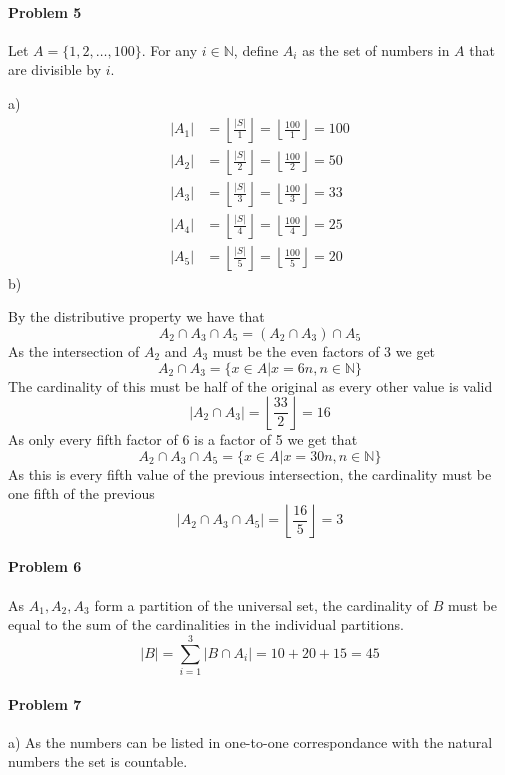 \paragraph{Problem 5}
Let $A=\{1,2,\ldots,100\}$. For any $i\in \mathbb{N}$, define $A_{i}$ as the set of numbers in $A$ that are divisible by $i$.

a)
\begin{align*}
    |A_{1}|&=\left\lfloor{\frac{|S|}{1}}\right\rfloor=\left\lfloor{\frac{100}{1}}\right\rfloor=100 \\
    |A_{2}|&=\left\lfloor{\frac{|S|}{2}}\right\rfloor=\left\lfloor{\frac{100}{2}}\right\rfloor=50 \\
    |A_{3}|&=\left\lfloor{\frac{|S|}{3}}\right\rfloor=\left\lfloor{\frac{100}{3}}\right\rfloor=33 \\
    |A_{4}|&=\left\lfloor{\frac{|S|}{4}}\right\rfloor=\left\lfloor{\frac{100}{4}}\right\rfloor=25 \\
    |A_{5}|&=\left\lfloor{\frac{|S|}{5}}\right\rfloor=\left\lfloor{\frac{100}{5}}\right\rfloor=20
\end{align*}
b)

By the distributive property we have that
\[
    A_2\cap A_3\cap A_5=(A_2\cap A_3)\cap A_5
\]
As the intersection of $A_2$ and $A_3$ must be the even factors of 3 we get
\[
    A_2\cap A_3=\{x\in A|x=6n,n\in \mathbb{N}\}
\]
The cardinality of this must be half of the original as every other value is valid
\[
    |A_2\cap A_3|=\left\lfloor{\frac{33}{2}}\right\rfloor=16
\]
As only every fifth factor of 6 is a factor of 5 we get that
\[
    A_2\cap A_3\cap A_5=\{x\in A|x=30n,n\in \mathbb{N}\}
\]
As this is every fifth value of the previous intersection, the cardinality must be one fifth of the previous
\[
    |A_2\cap A_3\cap A_5|=\left\lfloor{\frac{16}{5}}\right\rfloor=3
\]

\paragraph{Problem 6}
As $A_1,A_2,A_3$ form a partition of the universal set, the cardinality of $B$ must be equal to the sum of the cardinalities in the individual partitions.
\[
    |B|=\sum_{i=1}^{3} |B\cap A_i|=10+20+15=45
\]
\paragraph{Problem 7}
a)
As the numbers can be listed in one-to-one correspondance with the natural numbers the set is countable.

